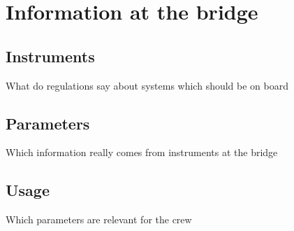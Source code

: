 \chapter{Information at the bridge}

\section{Instruments}
What do regulations say about systems which should be on board

\section{Parameters}
Which information really comes from instruments at the bridge

\section{Usage}
Which parameters are relevant for the crew